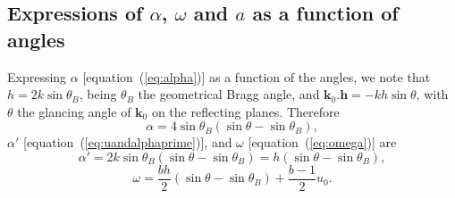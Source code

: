 \documentclass{iucr}
\begin{document}
\subsection{Expressions of  $\alpha$, $\omega$ and $a$ as a function of angles}
\label{sec:physical_meaning}
Expressing $\alpha$ [equation~(\ref{eq:alpha})] as a function of the angles, we note that $h=2k \sin\theta_B$, being $\theta_B$ the geometrical Bragg angle, and $\textbf{k}_0 . \textbf{h}= -k h \sin\theta$, with $\theta$ the glancing angle of $\textbf{k}_0$ on the reflecting planes. Therefore
\begin{equation}\label{eq:alphavsangles}
    \alpha=4\sin\theta_B (\sin\theta-\sin\theta_B),
\end{equation}
$\alpha'$ [equation~(\ref{eq:uandalphaprime})], and $\omega$ [equation~(\ref{eq:omega})] are
\begin{equation}\label{eq:alphaprimevsangles}
    \alpha'=2 k \sin\theta_B(\sin\theta-\sin\theta_B)=h(\sin\theta-\sin\theta_B),
\end{equation}
\begin{equation}\label{eq:omegavsangles}
    \omega=\frac{b h}{2} (\sin\theta-\sin\theta_B) + \frac{b-1}{2} u_0.
\end{equation}
\end{document}
